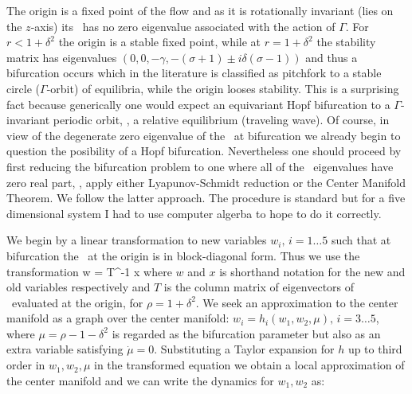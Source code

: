 The origin is a fixed point of the flow and as it is rotationally invariant (lies on the $z$-axis)
its \stabmat\ has no zero eigenvalue associated with the action of $\Gamma$. For $r<1+\delta^2$
the origin is a stable fixed point, while at $r=1+\delta^2$ the stability
matrix has eigenvalues $ \left(0,0,-\gamma ,-(\sigma+1) \pm i \delta  (\sigma-1) \right)$
and  thus a bifurcation occurs which in the literature is classified as pitchfork to a
stable circle ($\Gamma$-orbit) of equilibria, while the origin looses stability. This is a surprising
fact because generically  one would expect an equivariant Hopf bifurcation to a $\Gamma$-invariant periodic
orbit, \ie, a relative equilibrium (traveling wave). Of course, in view of the degenerate zero eigenvalue
of the \stabmat\ at bifurcation we already begin to question the posibility of a Hopf bifurcation.
Nevertheless one should proceed by first reducing the bifurcation problem to one where all of the \stabmat\ eigenvalues
have zero real part, \ie, apply either Lyapunov-Schmidt reduction or the Center Manifold Theorem.
We follow the latter approach. The procedure is standard but for a five dimensional system I had to use computer algerba
to hope to do it correctly.

We begin by a linear transformation to new variables $w_i,\, i=1\ldots 5$ such that at bifurcation
the \stabmat\ at the origin is in block-diagonal form. Thus we use the transformation
\beq
	w = T^{-1} x
\eeq
where $w$ and $x$ is shorthand notation for the new and old variables respectively and $T$ is the column matrix of
eigenvectors of \stabmat\ evaluated at the origin, for $\rho=1+\delta^2$. We seek an approximation to the center manifold
as a graph over the center manifold: $w_i = h_i(w_1,w_2,\mu),\, i=3\ldots5$, where $\mu=\rho-1-\delta^2$ is regarded
as the bifurcation parameter but also as an extra variable satisfying $\dot{\mu}=0$. Substituting a Taylor expansion for $h$
up to third order in $w_1,w_2,\mu$ in the transformed equation we obtain a local approximation of the center manifold
and we can write the dynamics for $w_1,w_2$ as:

